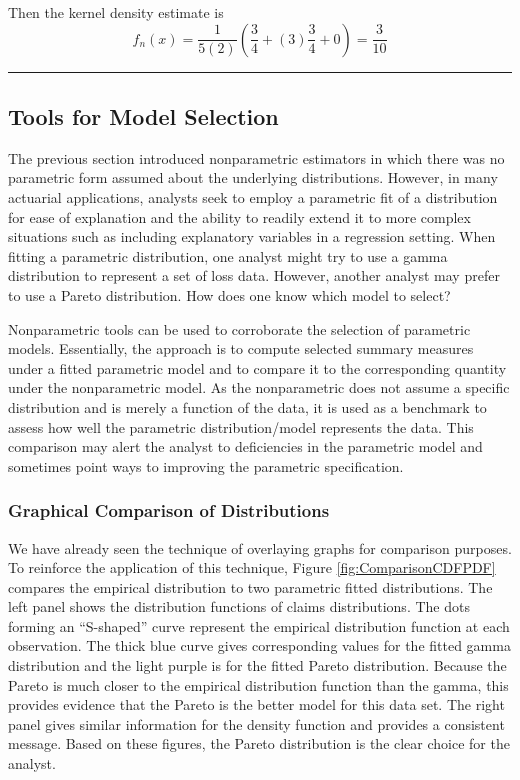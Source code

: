 \documentclass[]{book}
\theoremstyle{definition}
\theoremstyle{definition}
\theoremstyle{definition}
\theoremstyle{remark}
\begin{document}
Then the kernel density estimate is
\[f_n(x) = \frac{1}{5(2)}\left( \frac{3}{4} + (3) \frac{3}{4} + 0 \right) = \frac{3}{10}\]

\begin{center}\rule{0.5\linewidth}{\linethickness}\end{center}

\subsection{Tools for Model Selection}\label{S:MS:ToolsModelSelection}

The previous section introduced nonparametric estimators in which there
was no parametric form assumed about the underlying distributions.
However, in many actuarial applications, analysts seek to employ a
parametric fit of a distribution for ease of explanation and the ability
to readily extend it to more complex situations such as including
explanatory variables in a regression setting. When fitting a parametric
distribution, one analyst might try to use a gamma distribution to
represent a set of loss data. However, another analyst may prefer to use
a Pareto distribution. How does one know which model to select?

Nonparametric tools can be used to corroborate the selection of
parametric models. Essentially, the approach is to compute selected
summary measures under a fitted parametric model and to compare it to
the corresponding quantity under the nonparametric model. As the
nonparametric does not assume a specific distribution and is merely a
function of the data, it is used as a benchmark to assess how well the
parametric distribution/model represents the data. This comparison may
alert the analyst to deficiencies in the parametric model and sometimes
point ways to improving the parametric specification.

\subsubsection{Graphical Comparison of
Distributions}\label{graphical-comparison-of-distributions}

We have already seen the technique of overlaying graphs for comparison
purposes. To reinforce the application of this technique, Figure
\ref{fig:ComparisonCDFPDF} compares the empirical distribution to two
parametric fitted distributions. The left panel shows the distribution
functions of claims distributions. The dots forming an ``S-shaped''
curve represent the empirical distribution function at each observation.
The thick blue curve gives corresponding values for the fitted gamma
distribution and the light purple is for the fitted Pareto distribution.
Because the Pareto is much closer to the empirical distribution function
than the gamma, this provides evidence that the Pareto is the better
model for this data set. The right panel gives similar information for
the density function and provides a consistent message. Based on these
figures, the Pareto distribution is the clear choice for the analyst.
\end{document}

